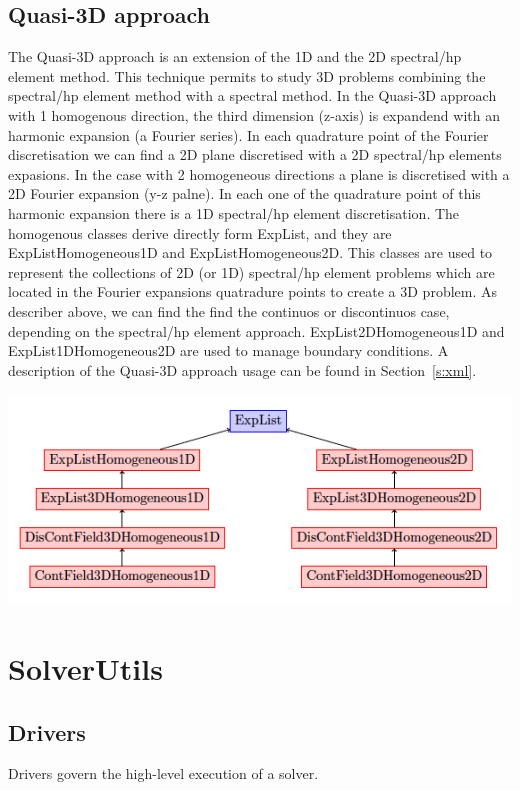 \subsection{Quasi-3D approach}

The Quasi-3D approach is an extension of the 1D and the 2D spectral/hp element
method. This technique permits to study 3D problems combining the spectral/hp
element method with a spectral method. In the Quasi-3D approach with 1
homogenous direction, the third dimension (z-axis) is expandend with an harmonic
expansion (a Fourier series). In each quadrature point of the Fourier
discretisation we can find a 2D plane discretised with a 2D spectral/hp elements
expasions. In the case with 2 homogeneous directions a plane is discretised with
a 2D Fourier expansion (y-z palne). In each one of the quadrature point of this
harmonic expansion there is a 1D spectral/hp element discretisation. The
homogenous classes derive directly form ExpList, and they are
ExpListHomogeneous1D and ExpListHomogeneous2D. This classes are used to
represent the collections of 2D (or 1D) spectral/hp element problems which are
located in the Fourier expansions quatradure points to create a 3D problem. As
describer above, we can find the find the continuos or discontinuos case,
depending on the spectral/hp element approach. ExpList2DHomogeneous1D and
ExpList1DHomogeneous2D are used to manage boundary conditions. A description of
the Quasi-3D approach usage can be found in Section~\ref{s:xml}.

\begin{center}
\includegraphics{img/Quasi3d.png}
\end{center}


\section{SolverUtils}

\subsection{Drivers}
Drivers govern the high-level execution of a solver.

